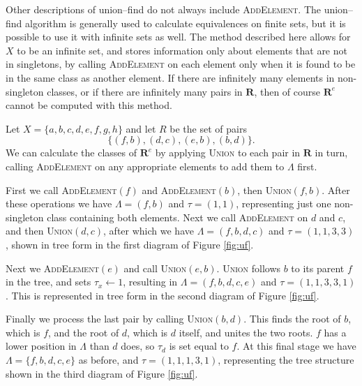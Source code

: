 Other descriptions of union--find do not always include \textsc{AddElement}.  The
union--find algorithm is generally used to calculate equivalences on finite sets,
but it is possible to use it with infinite sets as well.  The method described
here allows for $X$ to be an infinite set, and stores information only about
elements that are not in singletons, by calling \textsc{AddElement} on each
element only when it is found to be in the same class as another element.  If
there are infinitely many elements in non-singleton classes, or if there are
infinitely many pairs in $\mathbf{R}$, then of course $\mathbf{R}^e$ cannot be
computed with this method.

\begin{example}
  \label{ex:uf}
  Let $X = \{a,b,c,d,e,f,g,h\}$ and let $R$ be the set of pairs
  $$\{(f,b), (d,c), (e,b), (b,d)\}.$$
  We can calculate the classes of $\mathbf{R}^e$ by applying \textsc{Union} to
  each pair in $\mathbf{R}$ in turn, calling \textsc{AddElement} on any
  appropriate elements to add them to $\Lambda$ first.

  First we call \textsc{AddElement}$(f)$ and \textsc{AddElement}$(b)$, then
  \textsc{Union}$(f,b)$.  After these operations we have $\Lambda = (f,b)$ and
  $\tau = (1,1)$, representing just one non-singleton class containing both
  elements.  Next we call \textsc{AddElement} on $d$ and $c$, and then
  \textsc{Union}$(d,c)$, after which we have $\Lambda = (f,b,d,c)$ and
  $\tau = (1,1,3,3)$, shown in tree form in the first diagram of Figure
  \ref{fig:uf}.

  Next we \textsc{AddElement}$(e)$ and call \textsc{Union}$(e,b)$.
  \textsc{Union} follows $b$ to its parent $f$ in the tree, and sets
  $\tau_x \gets 1$, resulting in $\Lambda = (f,b,d,c,e)$ and
  $\tau = (1,1,3,3,1)$.  This is represented in tree form in the second diagram
  of Figure \ref{fig:uf}.

  Finally we process the last pair by calling \textsc{Union}$(b,d)$.  This finds
  the root of $b$, which is $f$, and the root of $d$, which is $d$ itself, and
  unites the two roots.  $f$ has a lower position in $\Lambda$ than $d$ does, so
  $\tau_d$ is set equal to $f$.  At this final stage we have
  $\Lambda = \{f,b,d,c,e\}$ as before, and $\tau = (1,1,1,3,1)$, representing
  the tree structure shown in the third diagram of Figure \ref{fig:uf}.


\end{example}
